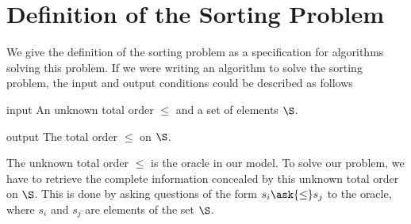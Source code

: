 \section{Definition of the Sorting Problem}
\label{tree:sorting:def}

We give the definition of the sorting problem as a specification for algorithms
solving this problem.
If we were writing an algorithm to solve the sorting problem, the input and output
conditions could be described as follows
\begin{problem}[Sorting]\mbox{}
\begin{steps}
\item[input] An unknown total order \(\le\) and a set of elements \(\S\).
\item[output] The total order \(\le\) on \(\S\).
\end{steps}
\end{problem}

The unknown total order \(\le\) is the oracle in our model. To solve our
problem, we have to retrieve the complete information concealed by this
unknown total order on \(\S\). This is done by asking questions of the
form \(s_i \ask{\le} s_j\) to the oracle, where \(s_i\) and \(s_j\) are
elements of the set \(\S\).

